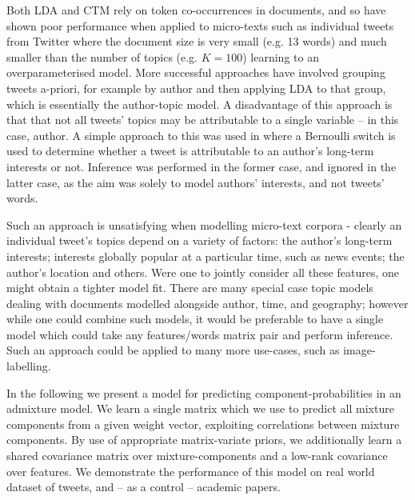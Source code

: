 Both LDA and CTM rely on token co-occurrences in documents, and so have shown poor performance when applied to micro-texts such as individual tweets from Twitter\cite{DeLaRosa2011} where the document size is very small (e.g. 13 words) and much smaller than the number of topics (e.g. $K=100$) learning to an overparameterised model. More successful approaches have involved grouping tweets a-priori, for example by author\cite{Weng2010}\cite{Xu2011}\cite{Hong2010}\cite{Eisenstein2010} and then applying LDA to that group, which is essentially the author-topic model\cite{MacCallum2007}. A disadvantage of this approach is that that not all tweets' topics may be attributable to a single variable -- in this case, author. A simple approach to this was used in \cite{Xu2011} where a Bernoulli switch is used to determine whether a tweet is attributable to an author's long-term interests or not. Inference was performed in the former case, and ignored in the latter case, as the aim was solely to model authors' interests, and not tweets' words.

Such an approach is unsatisfying when modelling micro-text corpora - clearly an individual tweet's topics depend on a variety of factors: the author's long-term interests; interests globally popular at a particular time, such as news events; the author's location and others. Were one to jointly consider all these features, one might obtain a tighter model fit. There are many special case topic models dealing with documents modelled alongside author\cite{RosenZvi2004}, time\cite{Wang2006}, and geography\cite{Eisenstein2010}; however while one could combine such models, it would be preferable to have a single model which could take any features/words matrix pair and perform inference. Such an approach could be applied to many more use-cases, such as image-labelling.

In the following we present a model for predicting component-probabilities in an admixture model. We learn a single matrix which we use to predict all mixture components from a given weight vector, exploiting correlations between mixture components. By use of appropriate matrix-variate priors, we additionally learn a shared covariance matrix over mixture-components and a low-rank covariance over features. We demonstrate the performance of this model on real world dataset of tweets, and -- as a control -- academic papers.


